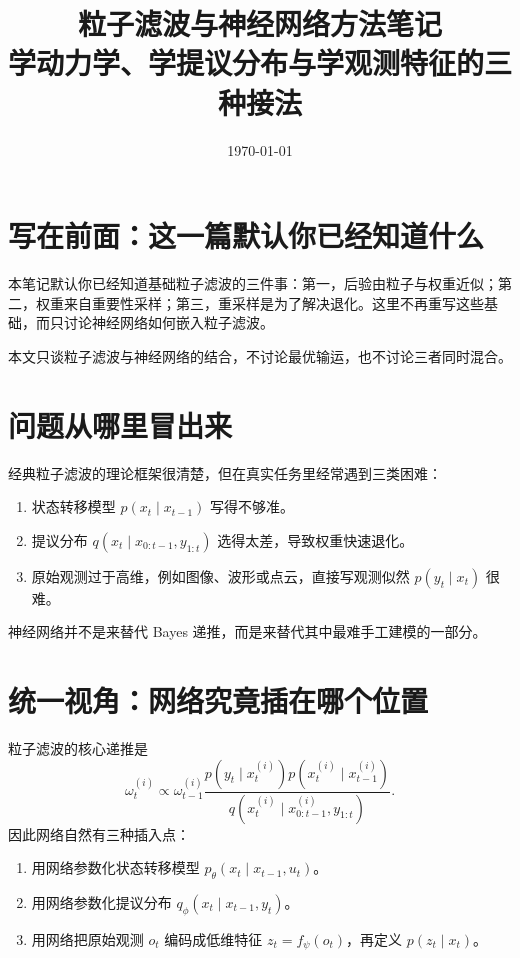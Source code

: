 \documentclass[12pt,a4paper]{ctexart}
\title{粒子滤波与神经网络方法笔记\\
\large 学动力学、学提议分布与学观测特征的三种接法}
\author{}
\date{\today}
\begin{document}
\maketitle
\tableofcontents

\section{写在前面：这一篇默认你已经知道什么}

本笔记默认你已经知道基础粒子滤波的三件事：第一，后验由粒子与权重近似；第二，权重来自重要性采样；第三，重采样是为了解决退化。这里不再重写这些基础，而只讨论神经网络如何嵌入粒子滤波。

本文只谈粒子滤波与神经网络的结合，不讨论最优输运，也不讨论三者同时混合。

\section{问题从哪里冒出来}

经典粒子滤波的理论框架很清楚，但在真实任务里经常遇到三类困难：

\begin{enumerate}
  \item 状态转移模型 \(p(x_t \mid x_{t-1})\) 写得不够准。
  \item 提议分布 \(q(x_t \mid x_{0:t-1}, y_{1:t})\) 选得太差，导致权重快速退化。
  \item 原始观测过于高维，例如图像、波形或点云，直接写观测似然 \(p(y_t \mid x_t)\) 很难。
\end{enumerate}

神经网络并不是来替代 Bayes 递推，而是来替代其中最难手工建模的一部分。

\section{统一视角：网络究竟插在哪个位置}

粒子滤波的核心递推是
\[
\omega_t^{(i)}
\propto \omega_{t-1}^{(i)}
\frac{p(y_t \mid x_t^{(i)}) p(x_t^{(i)} \mid x_{t-1}^{(i)})}
{q(x_t^{(i)} \mid x_{0:t-1}^{(i)}, y_{1:t})}.
\]
因此网络自然有三种插入点：

\begin{enumerate}
  \item 用网络参数化状态转移模型 \(p_\theta(x_t \mid x_{t-1},u_t)\)。
  \item 用网络参数化提议分布 \(q_\phi(x_t \mid x_{t-1}, y_t)\)。
  \item 用网络把原始观测 \(o_t\) 编码成低维特征 \(z_t=f_\psi(o_t)\)，再定义 \(p(z_t \mid x_t)\)。
\end{enumerate}
\end{document}

